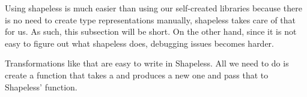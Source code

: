 Using shapeless is much easier than using our self-created libraries because
there is no need to create type representations manually, shapeless takes care
of that for us. As such, this subsection will be short. On the other hand, since
it is not easy to figure out what shapeless does, debugging issues becomes
harder.

\begin{example}

\end{example}

\begin{example}

Transformations like that are easy to write in Shapeless. All we need to do
is create a function that takes a  and produces a new one and pass
that to Shapeless'  function.



\end{example}
